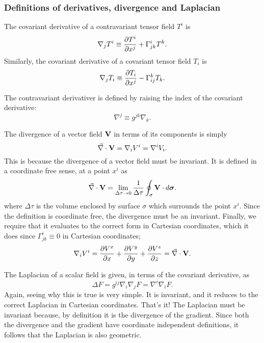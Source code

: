 \documentclass{article}
\begin{document}
\subsubsection{Definitions of derivatives, divergence and Laplacian}
\begin{definition}
	The covariant derivative of a contravariant tensor field $ T^{i} $ is
	\begin{equation}
	\nabla_{j} T^{i} \equiv \pdv{T^{i}}{x^{j}} + \Gamma^{i}_{jk} T^{k}.
	\end{equation}
	Similarly, the covariant derivative of a covariant tensor field $ T_{i} $ is
	\begin{equation}
	\nabla_{j} T_{i} \equiv \pdv{T_{i}}{x^{j}} - \Gamma^{k}_{ij} T_{k}.
	\end{equation}
\end{definition}
\begin{definition}
	The contravariant derivativer is defined by raising the index of the covariant derivative:
	\begin{equation}
	\nabla^{j} \equiv g^{jk} \nabla_{k}.
	\end{equation}
\end{definition}
\begin{proposition}[Divergence]
	The divergence of a vector field $ \vb{V} $ in terms of its components is simply
	\begin{equation}
	\vec{\nabla} \cdot \vb{V} = \nabla_{i} V^{i} = \nabla^{i} V_{i}.
	\end{equation}
	This is because the divergence of a vector field must be invariant. It is defined in a coordinate free sense, at a point $ x^{i} $ as
	\[
	\vec{\nabla} \cdot \vb{V} = \lim_{\Delta \tau \to 0} \frac{1}{\Delta \tau} \oint_\sigma \vb{V} \cdot \dd \boldsymbol{\sigma}.
	\]
	where $ \Delta \tau  $ is the volume enclosed by surface $ \sigma $ which surrounds the point $ x^{i} $. Since the definition is coordinate free, the divergence must be an invariant. Finally, we require that it evaluates to the correct form in Cartesian coordinates, which it does since $ \Gamma^{i}_{jk} \equiv 0 $ in Cartesian coordinates;
	\[
	\nabla_{i} V^{i} = \pdv{V^x}{x} + \pdv{V^{y}}{y} + \pdv{V^{z}}{z} = \vec{\nabla} \cdot \vb{V}.
	\]
\end{proposition}
\begin{proposition}[Laplacian]
	The Laplacian of a scalar field is given, in terms of the covariant derivative, as
	\[
	\Delta F = g^{ij} \nabla_{i} \nabla_{j} F = \nabla^{i} \nabla_{i} F.
	\]
	Again, seeing why this is true is very simple. It is invariant, and it reduces to the correct Laplacian in Cartesian coordinates. That's it! The Laplacian must be invariant because, by definition it is the divergence of the gradient. Since both the divergence and the gradient have coordinate independent definitions, it follows that the Laplacian is also geometric.
\end{proposition}
\end{document}
